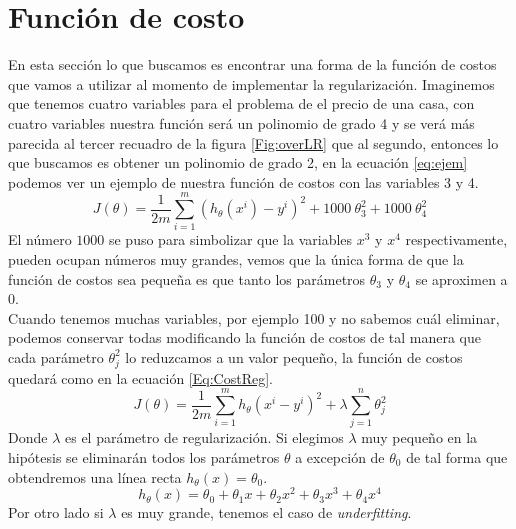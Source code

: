 \documentclass{report}
\begin{document}
\section{Función de costo}
En esta sección lo que buscamos es encontrar una forma de la función de costos que vamos a utilizar al momento de implementar la regularización. Imaginemos que tenemos cuatro variables para el problema de el precio de una casa, con cuatro variables nuestra función será un polinomio de grado 4 y se verá más parecida al tercer recuadro de la figura \ref{Fig:overLR} que al segundo, entonces lo que buscamos es obtener un polinomio de grado 2, en la ecuación \ref{eq:ejem} podemos ver un ejemplo de nuestra función de costos con las variables 3 y 4.
\begin{equation}
	J(\theta)=\frac{1}{2m}\sum_{i=1}^{m}(h_\theta(x^i)-y^i)^2+1000\ \theta_3^2+1000\ \theta_4^2
	\label{eq:ejem}
\end{equation}
El número $ 1000 $ se puso para simbolizar que la variables $ x^3 $ y $ x^4 $ respectivamente, pueden ocupan números muy grandes, vemos que la única forma de que la función de costos sea pequeña es que tanto los parámetros $ \theta_3 $ y $ \theta_4 $ se aproximen a 0. \\Cuando tenemos muchas variables, por ejemplo 100 y no sabemos cuál eliminar, podemos conservar todas modificando la función de costos de tal manera que cada parámetro $ \theta_j^2 $ lo reduzcamos a un valor pequeño, la función de costos quedará como en la ecuación \ref{Eq:CostReg}.
\begin{equation}
	J(\theta)=\frac{1}{2m}\sum_{i=1}^{m}h_\theta(x^i-y^i)^2+\lambda\sum_{j=1}^{n}\theta_j^2
	\label{Eq:CostReg}
\end{equation}
Donde \textbf{$ \lambda $} es el parámetro de regularización. Si elegimos $ \lambda $ muy pequeño en la hipótesis se eliminarán todos los parámetros $ \theta $ a excepción de $ \theta_0 $ de tal forma que obtendremos una línea recta $ h_\theta(x) =\theta_0$.
\[
 h_\theta(x) =\theta_0 + \theta_1x +\theta_2x^2+\theta_3x^3+\theta_4x^4
\]
Por otro lado si $ \lambda $ es muy grande, tenemos el caso de \textit{underfitting}.
\end{document}
